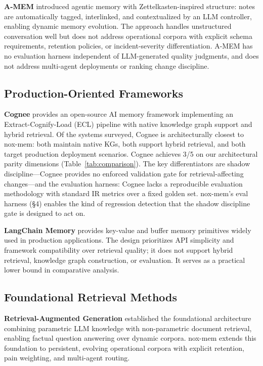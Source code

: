 \documentclass{article}
\begin{document}
\textbf{A-MEM} \cite{xu2025amem} introduced agentic memory with Zettelkasten-inspired
structure: notes are automatically tagged, interlinked, and contextualized by an LLM
controller, enabling dynamic memory evolution. The approach handles unstructured
conversation well but does not address operational corpora with explicit schema
requirements, retention policies, or incident-severity differentiation. A-MEM has no
evaluation harness independent of LLM-generated quality judgments, and does not address
multi-agent deployments or ranking change discipline.

\subsection{Production-Oriented Frameworks}

\textbf{Cognee} \cite{topoteretes2024cognee} provides an open-source AI memory framework
implementing an Extract-Cognify-Load (ECL) pipeline with native knowledge graph support
and hybrid retrieval. Of the systems surveyed, Cognee is architecturally closest to
nox-mem: both maintain native KGs, both support hybrid retrieval, and both target
production deployment scenarios. Cognee achieves 3/5 on our architectural parity dimensions
(Table~\ref{tab:comparison}). The key differentiators are shadow discipline---Cognee provides
no enforced validation gate for retrieval-affecting changes---and the evaluation harness:
Cognee lacks a reproducible evaluation methodology with standard IR metrics over a fixed
golden set. nox-mem's eval harness (\S4) enables the kind of regression detection that the
shadow discipline gate is designed to act on.

\textbf{LangChain Memory} provides key-value and buffer memory primitives widely used in
production applications. The design prioritizes API simplicity and framework compatibility
over retrieval quality; it does not support hybrid retrieval, knowledge graph construction,
or evaluation. It serves as a practical lower bound in comparative analysis.

\subsection{Foundational Retrieval Methods}

\textbf{Retrieval-Augmented Generation} \cite{lewis2020rag} established the foundational
architecture combining parametric LLM knowledge with non-parametric document retrieval,
enabling factual question answering over dynamic corpora. nox-mem extends this foundation
to persistent, evolving operational corpora with explicit retention, pain weighting, and
multi-agent routing.
\end{document}
